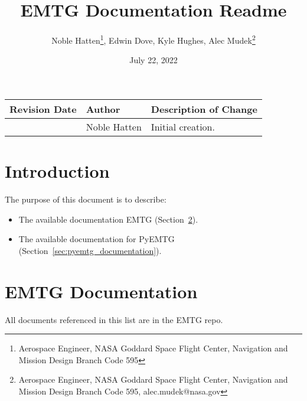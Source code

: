 \documentclass[11pt]{article}
\title{{\Huge EMTG Documentation Readme}}
\author
{
	Noble Hatten\thanks{Aerospace Engineer, NASA Goddard Space Flight Center, Navigation and Mission Design Branch Code 595}, 
	Edwin Dove\footnotemark[1], 
	Kyle Hughes\footnotemark[1], 
	Alec Mudek\thanks{Aerospace Engineer, NASA Goddard Space Flight Center, Navigation and Mission Design Branch Code 595, alec.mudek@nasa.gov}
}
\date{}
\begin{document}
	
\begin{titlepage}
	\maketitle
	\begin{table}[H]
		\centering
		\begin{tabularx}{\textwidth}{|l|l|X|}
			\hline
			\textbf{Revision Date} & \textbf{Author} & \textbf{Description of Change} \\ \hline
			\date{July 22, 2022} & Noble Hatten & Initial creation.\\
			\hline
		\end{tabularx}
	\end{table}
\end{titlepage}

\newpage
\tableofcontents
\thispagestyle{empty}
\newpage

\clearpage
\setcounter{page}{1}



\section{Introduction}
\label{sec:introduction}

The purpose of this document is to describe:

\begin{itemize}
	\item The available documentation \ac{EMTG} (Section~\ref{sec:emtg_documentation}).
	\item The available documentation for PyEMTG (Section~\ref{sec:pyemtg_documentation}).
\end{itemize}

\section{\ac{EMTG} Documentation}
\label{sec:emtg_documentation}

All documents referenced in this list are in the \ac{EMTG} repo.
\end{document}
